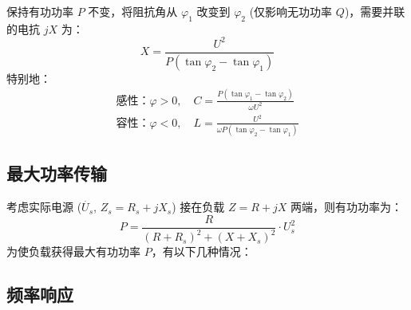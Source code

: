 \documentclass[a4paper]{article}  %
\theoremstyle{MyLineTheoremStyle} %
\theoremstyle{MyBlockTheoremStyle} %
\theoremstyle{MySubsubsectionStyle} %
\begin{document}
\begin{multicols*}{4}
保持有功功率 $P$ 不变，将阻抗角从 $\varphi_1$ 改变到 $\varphi_2$ (仅影响无功功率 $Q$)，需要并联的电抗 $j X$ 为：
\begin{equation}
X = \frac{U^2}{P \left(\tan \varphi_2 - \tan \varphi_1\right)}
\end{equation}
特别地：
\begin{gather}
    \text{感性：} \varphi > 0 ,\quad 
    C = \frac{P \left(\tan \varphi_1 - \tan \varphi_2\right)}{\omega U^2}
    \\ 
    \text{容性：} \varphi < 0 , \quad 
    L = \frac{U^2}{\omega P \left(\tan \varphi_2 - \tan \varphi_1\right)}
\end{gather}


\subsection{最大功率传输}
考虑实际电源 ($\dot{U_s}$, $Z_s = R_s + j X_s$) 接在负载 $Z = R + jX$ 两端，则有功功率为：
\begin{equation}
P = \frac{R}{(R + R_s)^2 + (X + X_s)^2} \cdot U_s^2 
\end{equation}
为使负载获得最大有功功率 $P$，有以下几种情况：
\vspace*{-3mm}
\begin{table}[H]\centering
    \renewcommand{\arraystretch}{3} %
\end{table}



\subsection{频率响应}


\end{multicols*}
\end{document}
